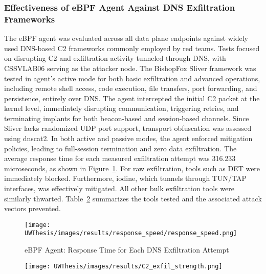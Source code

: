 \documentclass [11pt, proquest] {uwthesis}[2020/02/24]
\begin{document}
\subsubsection{Effectiveness of eBPF Agent Against DNS Exfiltration Frameworks}
The eBPF agent was evaluated across all data plane endpoints against widely used DNS-based C2 frameworks commonly employed by red teams. Tests focused on disrupting C2 and exfiltration activity tunneled through DNS, with CSSVLAB06 serving as the attacker node. The BishopFox Sliver framework was tested in agent's active mode for both basic exfiltration and advanced operations, including remote shell access, code execution, file transfers, port forwarding, and persistence, entirely over DNS. The agent intercepted the initial C2 packet at the kernel level, immediately disrupting communication, triggering retries, and terminating implants for both beacon-based and session-based channels. Since Sliver lacks randomized UDP port support, transport obfuscation was assessed using dnscat2. In both active and passive modes, the agent enforced mitigation policies, leading to full-session termination and zero data exfiltration. The average response time for each measured exfiltration attempt was 316.233 microseconds, as shown in Figure~\ref{fig:response_speed}. For raw exfiltration, tools such as DET were immediately blocked. Furthermore, iodine, which tunnels through TUN/TAP interfaces, was effectively mitigated. All other bulk exfiltration tools were similarly thwarted. Table~\ref{tab:dns-framework-coverage} summarizes the tools tested and the associated attack vectors prevented.

\begin{figure}[H] 
 \centering
 \begin{minipage}[b]{1\textwidth}
    \centering
    \texttt{[image: UWThesis/images/results/response\_speed/response\_speed.png]}
    \caption{eBPF Agent: Response Time for Each DNS Exfiltration Attempt}
    \label{fig:response_speed}
  \end{minipage}

\end{figure}


\begin{figure}[H]
  \centering
  \begin{minipage}[b]{0.95\textwidth}
    \centering
    \texttt{[image: UWThesis/images/results/C2\_exfil\_strength.png]}
    \label{tab:dns-framework-coverage}
  \end{minipage}
\end{figure}
\end{document}
